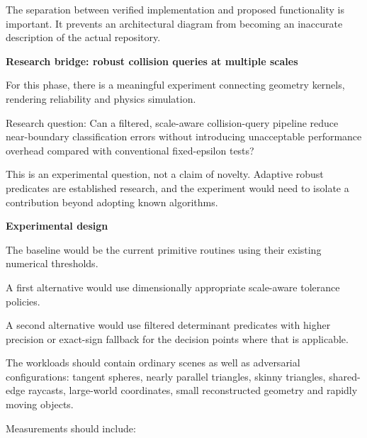 The separation between verified implementation and proposed functionality is important. It prevents an architectural diagram from becoming an inaccurate description of the actual repository.

\textbf{Research bridge: robust collision queries at multiple scales}

For this phase, there is a meaningful experiment connecting geometry kernels, rendering reliability and physics simulation.

Research question: Can a filtered, scale-aware collision-query pipeline reduce near-boundary classification errors without introducing unacceptable performance overhead compared with conventional fixed-epsilon tests?

This is an experimental question, not a claim of novelty. Adaptive robust predicates are established research, and the experiment would need to isolate a contribution beyond adopting known algorithms.

\textbf{Experimental design}

The baseline would be the current primitive routines using their existing numerical thresholds.

A first alternative would use dimensionally appropriate scale-aware tolerance policies.

A second alternative would use filtered determinant predicates with higher precision or exact-sign fallback for the decision points where that is applicable.

The workloads should contain ordinary scenes as well as adversarial configurations: tangent spheres, nearly parallel triangles, skinny triangles, shared-edge raycasts, large-world coordinates, small reconstructed geometry and rapidly moving objects.

Measurements should include:

